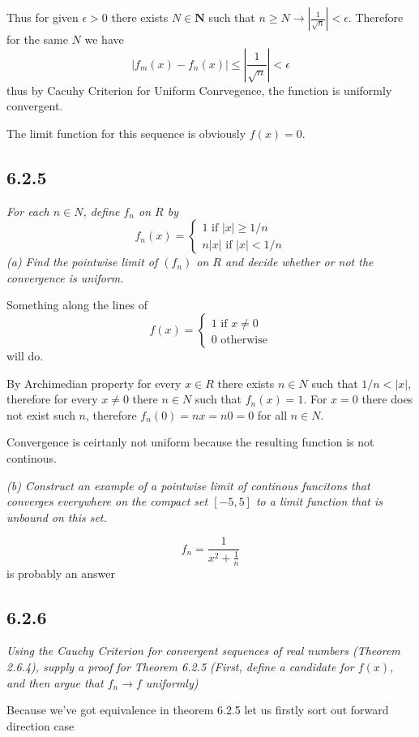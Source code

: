 \documentclass[11pt,oneside,titlepage]{book}
\begin{document}
Thus for given $\epsilon > 0$ there exists $N \in \textbf{N}$ such that
$n \geq N \to |\frac{1}{\sqrt{n}}| < \epsilon$. Therefore for the same
$N$ we have
$$|f_m(x) - f_n(x)| \leq |\frac{1}{\sqrt{n}}| < \epsilon$$
thus by Cacuhy Criterion for Uniform Conrvegence, the function  is
uniformly convergent.

The limit function for this sequence is obviously $f(x) = 0$.

\subsection*{6.2.5}
\textit{For each $n \in N$, define $f_n$ on $R$ by}
$$f_n(x) =
\begin{cases}
  1 \text{ if } |x| \geq 1/n \\
  n|x| \text{ if } |x| < 1/n
\end{cases}
$$
\textit{(a) Find the pointwise limit of $(f_n)$ on $R$ and
  decide whether or not the convergence is uniform. }

Something along the lines of 
$$f(x) =
\begin{cases}
  1 \text{ if } x \neq 0 \\
  0 \text{ otherwise}
\end{cases}
$$
will do.

By Archimedian property for every $x \in R$ there exists $n \in N$ such that
$1/n < |x|$, therefore for every $x \neq 0$ there $n \in N$ such that
$f_n(x) = 1$. For $x = 0$ there does not exist such $n$, therefore $f_n(0) =
nx = n0 = 0$ for all $n \in N$.

Convergence is ceirtanly not uniform because the resulting function is not
continous.

\textit{(b) Construct an example of a pointwise limit of continous funcitons
  that converges everywhere on the compact set $[-5, 5]$ to a limit function
  that is unbound on this set.}

$$f_n = \frac{1}{x^2 + \frac{1}{n}}$$
is probably an answer

\subsection*{6.2.6}
\textit{Using the Cauchy Criterion for convergent sequences of real numbers
  (Theorem 2.6.4), supply a proof for Theorem 6.2.5 (First, define a candidate
  for $f(x)$, and then argue that $f_n \to f$ uniformly)}

Because we've got equivalence in theorem 6.2.5 let us firstly sort
out forward direction case
\end{document}
